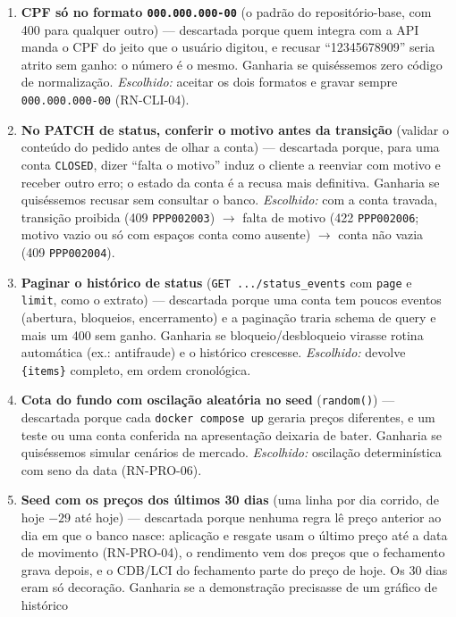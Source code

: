 \documentclass[11pt,a4paper]{article}
\newcommand{\tb}[1]{\texttt{#1}}           %
\begin{document}
\begin{enumerate}
  conexão com a vertical de fundos da QI Tech. \textbf{Vira o plano de corte:} se o núcleo atrasar,
  os investimentos são reduzidos (ver Seção~\ref{sec:plano}).
  \item \textbf{CPF só no formato \tb{000.000.000-00}} (o padrão do repositório-base, com 400
  para qualquer outro) --- descartada porque quem integra com a API manda o CPF do jeito que o
  usuário digitou, e recusar ``12345678909'' seria atrito sem ganho: o número é o mesmo.
  Ganharia se quiséssemos zero código de normalização. \emph{Escolhido:} aceitar os dois
  formatos e gravar sempre \tb{000.000.000-00} (RN-CLI-04).
  \item \textbf{No PATCH de status, conferir o motivo antes da transição} (validar o conteúdo do
  pedido antes de olhar a conta) --- descartada porque, para uma conta \tb{CLOSED}, dizer ``falta
  o motivo'' induz o cliente a reenviar com motivo e receber outro erro; o estado da conta é a
  recusa mais definitiva. Ganharia se quiséssemos recusar sem consultar o banco. \emph{Escolhido:}
  com a conta travada, transição proibida (409 \tb{PPP002003}) $\to$ falta de motivo (422
  \tb{PPP002006}; motivo vazio ou só com espaços conta como ausente) $\to$ conta não vazia (409
  \tb{PPP002004}).
  \item \textbf{Paginar o histórico de status} (\tb{GET .../status_events} com \tb{page} e
  \tb{limit}, como o extrato) --- descartada porque uma conta tem poucos eventos (abertura,
  bloqueios, encerramento) e a paginação traria schema de query e mais um 400 sem ganho. Ganharia
  se bloqueio/desbloqueio virasse rotina automática (ex.: antifraude) e o histórico crescesse.
  \emph{Escolhido:} devolve \tb{\{items\}} completo, em ordem cronológica.
  \item \textbf{Cota do fundo com oscilação aleatória no seed} (\tb{random()}) --- descartada
  porque cada \tb{docker compose up} geraria preços diferentes, e um teste ou uma conta conferida
  na apresentação deixaria de bater. Ganharia se quiséssemos simular cenários de mercado.
  \emph{Escolhido:} oscilação determinística com seno da data (RN-PRO-06).
  \item \textbf{Seed com os preços dos últimos 30 dias} (uma linha por dia corrido, de hoje $-29$
  até hoje) --- descartada porque nenhuma regra lê preço anterior ao dia em que o banco nasce:
  aplicação e resgate usam o último preço até a data de movimento (RN-PRO-04), o rendimento vem
  dos preços que o fechamento grava depois, e o CDB/LCI do fechamento parte do preço de hoje. Os
  30 dias eram só decoração. Ganharia se a demonstração precisasse de um gráfico de histórico

\end{enumerate}
\end{document}
